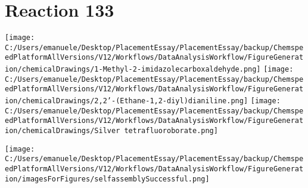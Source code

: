 \documentclass{article}%
\begin{document}
\section*{Reaction 133}%
%
\begin{scheme}[H]%
\begin{minipage}{0.5\textwidth}%
\texttt{[image: C:/Users/emanuele/Desktop/PlacementEssay/PlacementEssay/backup/ChemspeedPlatformAllVersions/V12/Workflows/DataAnalysisWorkflow/FigureGeneration/chemicalDrawings/1-Methyl-2-imidazolecarboxaldehyde.png]}%
\texttt{[image: C:/Users/emanuele/Desktop/PlacementEssay/PlacementEssay/backup/ChemspeedPlatformAllVersions/V12/Workflows/DataAnalysisWorkflow/FigureGeneration/chemicalDrawings/2,2'-(Ethane-1,2-diyl)dianiline.png]}%
\texttt{[image: C:/Users/emanuele/Desktop/PlacementEssay/PlacementEssay/backup/ChemspeedPlatformAllVersions/V12/Workflows/DataAnalysisWorkflow/FigureGeneration/chemicalDrawings/Silver tetrafluoroborate.png]}%
\end{minipage}%
\begin{minipage}{0.5\textwidth}%
\begin{center}%
\texttt{[image: C:/Users/emanuele/Desktop/PlacementEssay/PlacementEssay/backup/ChemspeedPlatformAllVersions/V12/Workflows/DataAnalysisWorkflow/FigureGeneration/imagesForFigures/selfassemblySuccessful.png]}%
\end{center}%
\end{minipage}%
\caption{Self-assembly of components 12, 20, with Silver(I) in a 3.0:1.5:1.0 molar ratio in CH$_3$CN at 60\textdegree C for 40h. These are the reagents (starting materials) for reaction 133.}%
\end{scheme}%
\end{document}
